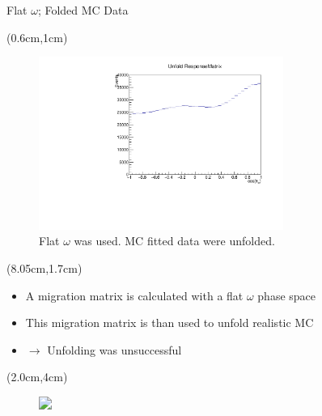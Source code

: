 \documentclass[
		10pt
		]{beamer}
\begin{document}
\begin{frame}{Flat $\omega$; Folded MC Data}



	
	\begin{textblock*}{6.5cm}(0.6cm,1cm)
		
		\begin{figure} 
		
		\includegraphics[width=8cm]{Plots/FlatMC.pdf}
		\captionsetup{labelformat=empty}
		\caption{Flat $\omega$ was used. MC fitted data were unfolded.}
\end{figure}	
\end{textblock*}

\begin{textblock*}{4.5cm}(8.05cm,1.7cm)
	\begin{itemize}
		
	
		\item A migration matrix is calculated with a flat $\omega$ phase space
		\item This migration matrix is than used to unfold realistic MC 
		
		
		\item $\rightarrow$ Unfolding was unsuccessful
	\end{itemize}
\end{textblock*}


\begin{textblock*}{6cm}(2.0cm,4cm)
	
	\begin{figure}
		\includegraphics<2>[width=6cm]{Plots/1}
	\end{figure}
	

\end{textblock*}




\end{frame}
\end{document}
